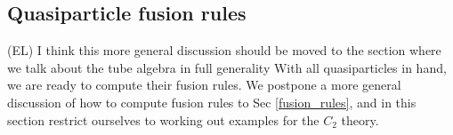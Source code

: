 \documentclass[12pt,a4paper]{article}
\newcommand{\tp}{\otimes}
\newcommand\be            {\begin{equation}}
\newcommand\ee            {\end{equation}}
\newcommand{\ethan}[1]{{\color{amethyst}\footnotesize{(EL) #1}}}
\newcommand{\kw}[1]{{\color{kwcolor}\footnotesize{(KW) #1}}}
\begin{document}

\subsection{Quasiparticle fusion rules} \label{C2_fusion_rules}
\ethan{I think this more general discussion should be moved to the section where we talk about the tube algebra in full generality}
With all quasiparticles in hand, we are ready to compute their fusion rules. 
We postpone a more general discussion of how to compute fusion rules to Sec \ref{fusion_rules}, and in this section restrict ourselves to working out examples for the $C_2$ theory. 
\end{document}
